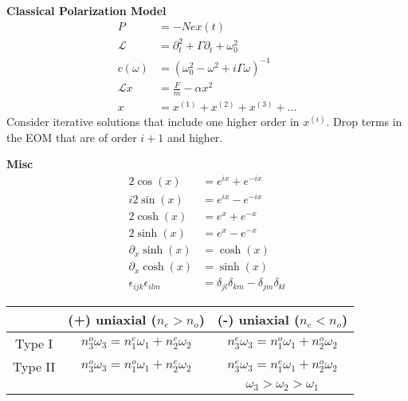 \documentclass[12pt]{article}
\begin{document}
\begin{multicols}{3}
\textbf{Classical Polarization Model}
\begin{align}
P &= -Nex(t)\\
\mathcal{L} &= \partial_t^2 + \Gamma\partial_t + \omega_0^2\\
c(\omega) &= (\omega_0^2 - \omega^2 + i\Gamma\omega)^{-1}\\
\mathcal{L}x &= \frac{F}{m} - \alpha x^2\\
x &= x^{(1)} + x^{(2)} + x^{(3)} + \dots
\end{align}
Consider iterative solutions that include one higher order in $x^{(i)}$. Drop terms in the
EOM that are of order $i + 1$ and higher.

\textbf{Misc}
\begin{align}
  2\cos(x) &= e^{ix} + e^{-ix}\\
  i2\sin(x) &= e^{ix} - e^{-ix}\\
  2\cosh(x) &= e^x + e^{-x}\\
  2\sinh(x) &= e^x - e^{-x}\\
  \partial_x \sinh(x) &= \cosh(x)\\
  \partial_x \cosh(x) &= \sinh(x)\\
  \epsilon_{ijk} \epsilon_{ilm} &= \delta_{jl} \delta_{km} - \delta_{jm} \delta_{kl}
\end{align}

\end{multicols}

\begin{table}
  \begin{tabular}{c|c|c}
    &(+) uniaxial ($n_e > n_o$)& (-) uniaxial ($n_e < n_o$)\\
    \hline
    Type I & $n_3^o \omega_3 = n_1^e \omega_1 + n_2^e \omega_2$ & $n_3^e \omega_3 = n_1^o \omega_1 + n_2^o \omega_2$\\
    Type II & $n_3^o \omega_3 = n_1^o \omega_1 + n_2^e \omega_2$ & $n_3^e \omega_3 = n_1^e \omega_1 + n_2^o \omega_2$\\
    && $\omega_3 > \omega_2 > \omega_1$\\
  \end{tabular}
\end{table}
\end{document}
